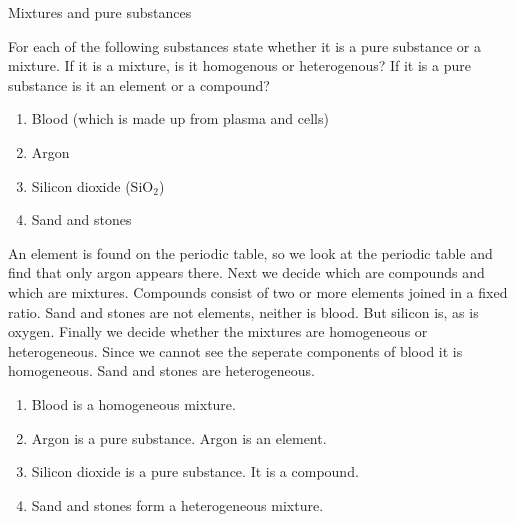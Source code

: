 \label{m38708*eip-524}
      \begin{wex}
{Mixtures and pure substances}
{For each of the following substances state whether it is a pure substance or a mixture. If it is a mixture, is it homogenous or heterogenous? If it is a pure substance is it an element or a compound? 
\label{m38708*eip-id1167351497334}\begin{enumerate}[noitemsep, label=\textbf{\alph*}. ] 
\item Blood (which is made up from plasma and cells)
\item Argon
\item Silicon dioxide (${\mathrm{SiO}}_{2}$)
\item Sand and stones
\end{enumerate}
  \par }
{
An element is found on the periodic table, so we look at the periodic table and find that only argon appears there. Next we decide which are compounds and which are mixtures. Compounds consist of two or more elements joined in a fixed ratio. Sand and stones are not elements, neither is blood. But silicon is, as is oxygen. Finally we decide whether the mixtures are homogeneous or heterogeneous. Since we cannot see the seperate components of blood it is homogeneous. Sand and stones are heterogeneous.
{}
\begin{enumerate}
[noitemsep, label=\textbf{\alph*}. ]
\item Blood is a homogeneous mixture.
\item Argon is a pure substance. Argon is an element.
\item Silicon dioxide is a pure substance. It is a compound.
\item Sand and stones form a heterogeneous mixture.
\end{enumerate}}
    \end{wex}
